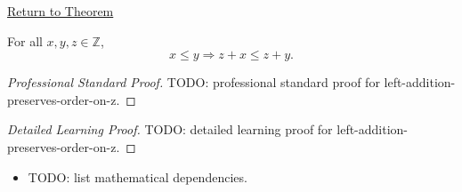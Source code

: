 \newpage
{}
\label{prf:left-addition-preserves-order-on-z}

\begin{remark*}[Return]
\hyperref[thm:left-addition-preserves-order-on-z]{Return to Theorem}
\end{remark*}

\begin{theorem*}
For all $x,y,z\in\mathbb{Z}$,
\[
x\le y \Longrightarrow z+x\le z+y.
\]
\end{theorem*}

\begin{proof}[Professional Standard Proof]
\LRAProofBodyStart
TODO: professional standard proof for left-addition-preserves-order-on-z.
\end{proof}

\begin{proof}[Detailed Learning Proof]
\LRAProofBodyStart
TODO: detailed learning proof for left-addition-preserves-order-on-z.
\end{proof}

\begin{remark*}
\end{remark*}

\begin{dependencies}
\begin{itemize}
  \item TODO: list mathematical dependencies.
\end{itemize}
\end{dependencies}

\clearpage
